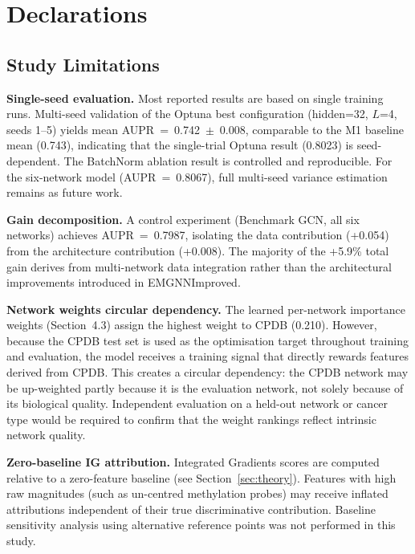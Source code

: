 
\section*{Declarations}

\subsection*{Study Limitations}

\textbf{Single-seed evaluation.} Most reported results are based on single training runs.
Multi-seed validation of the Optuna best configuration (hidden=32, $L$=4, seeds 1--5)
yields mean AUPR~=~0.742~$\pm$~0.008, comparable to the M1 baseline mean (0.743), indicating
that the single-trial Optuna result (0.8023) is seed-dependent. The BatchNorm ablation
result is controlled and reproducible. For the six-network model (AUPR~=~0.8067), full
multi-seed variance estimation remains as future work.

\textbf{Gain decomposition.} A control experiment (Benchmark GCN, all six networks)
achieves AUPR~=~0.7987, isolating the data contribution (+0.054) from the architecture
contribution (+0.008). The majority of the +5.9\% total gain derives from multi-network
data integration rather than the architectural improvements introduced in EMGNNImproved.

\textbf{Network weights circular dependency.} The learned per-network importance weights
(Section~4.3) assign the highest weight to CPDB (0.210). However, because the CPDB test
set is used as the optimisation target throughout training and evaluation, the model
receives a training signal that directly rewards features derived from CPDB. This creates
a circular dependency: the CPDB network may be up-weighted partly because it is the
evaluation network, not solely because of its biological quality. Independent evaluation
on a held-out network or cancer type would be required to confirm that the weight
rankings reflect intrinsic network quality.

\textbf{Zero-baseline IG attribution.} Integrated Gradients scores are computed relative
to a zero-feature baseline (see Section~\ref{sec:theory}). Features with high raw
magnitudes (such as un-centred methylation probes) may receive inflated attributions
independent of their true discriminative contribution. Baseline sensitivity analysis
using alternative reference points was not performed in this study.

